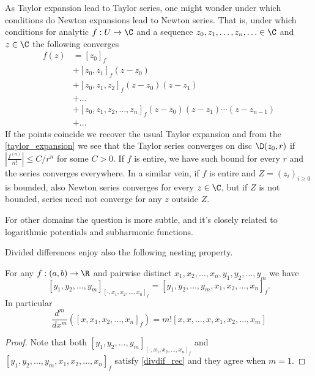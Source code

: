 \begin{huom}
	As Taylor expansion lead to Taylor series, one might wonder under which conditions do Newton expansions lead to Newton series. That is, under which conditions for analytic $f : U \to \C$ and a sequence $z_{0}, z_{1}, \ldots, z_{n}, \ldots \in \C$ and $z \in \C$ the following converges
	\begin{align*}
		f(z) &= [z_{0}]_{f} \\
		&+ [z_{0}, z_{1}]_{f} (z - z_{0}) \\
		&+ [z_{0}, z_{1}, z_{2}]_{f} (z - z_{0}) (z - z_{1}) \\
		&+ \ldots \\
		&+ [z_{0}, z_{1}, z_{2}, \ldots, z_{n}]_{f} (z - z_{0}) (z - z_{1}) \cdots (z - z_{n - 1}) \\
		&+ \ldots
	\end{align*}
	If the points coincide we recover the usual Taylor expansion and from the \ref{taylor_expansion} we see that the Taylor series converges on disc $\D(z_{0}, r)$ if $\left|\frac{f^{(n)}}{n!}\right| \leq C/r^{n}$ for some $C > 0$. If $f$ is entire, we have such bound for every $r$ and the series converges everywhere. In a similar vein,
	if $f$ is entire and $Z = (z_{i})_{i \geq 0}$ is bounded, also Newton series converges for every $z \in \C$, but if $Z$ is not bounded, series need not converge for any $z$ outside $Z$.

	For other domains the question is more subtle, and it's closely related to logarithmic potentials and subharmonic functions.
\end{huom}

Divided differences enjoy also the following nesting property.

\begin{prop}
	For any $f : (a, b) \to \R$ and pairwise distinct $x_{1}, x_{2}, \ldots, x_{n}, y_{1}, y_{2}, \ldots, y_{m}$ we have
	\[
		[y_{1}, y_{2}, \ldots, y_{m}]_{[\cdot, x_{1}, x_{2}, \ldots, x_{n}]_{f}} = [y_{1}, y_{2}, \ldots, y_{m}, x_{1}, x_{2}, \ldots, x_{n}]_{f}.
	\]
	In particular
	\[
		\frac{d^{m}}{d x^{m}} \left([x, x_{1}, x_{2}, \ldots, x_{n}]_{f}\right) = m! [x, x, \ldots, x, x_{1}, x_{2}, \ldots, x_{m}]
	\]
\end{prop}
\begin{proof}
	Note that both $[y_{1}, y_{2}, \ldots, y_{m}]_{[\cdot, x_{1}, x_{2}, \ldots, x_{n}]_{f}}$ and $[y_{1}, y_{2}, \ldots, y_{m}, x_{1}, x_{2}, \ldots, x_{n}]_{f}$ satisfy \ref{divdif_rec} and they agree when $m = 1$.
\end{proof}

